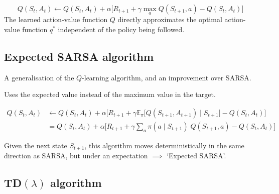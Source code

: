 \begin{equation}
    Q(S_t, A_t) \leftarrow Q(S_t, A_t) + \alpha \Big[ R_{t+1} + \gamma \max_{a} Q(S_{t+1}, a) - Q(S_t, A_t) \Big]
\end{equation}
The learned action-value function \( Q \) directly approximates the optimal action-value function \( q^* \) independent of the policy being followed.

\subsection{Expected SARSA algorithm}

A generalisation of the \( Q \)-learning algorithm, and an improvement over SARSA.\@

Uses the expected value instead of the maximum value in the target.

\begin{equation}
    \begin{aligned}
        Q(S_t, A_t)
         & \leftarrow
        Q(S_t, A_t) + \alpha \Big[ R_{t+1} + \gamma \mathbb{E}_{\pi} \big[ Q(S_{t+1}, A_{t+1}) \;\big|\; S_{t+1} \big] - Q(S_t, A_t) \Big]
        \\ & =
        Q(S_t, A_t) + \alpha \Big[ R_{t+1} + \gamma \sum_{a} \pi(a \mid S_{t+1}) \; Q(S_{t+1}, a) - Q(S_t, A_t) \Big]
    \end{aligned}
\end{equation}

Given the next state \( S_{t+1} \), this algorithm moves deterministically in the same direction as SARSA, but under an expectation \( \implies \) `Expected SARSA'.

\subsection{TD\texorpdfstring{\( (\lambda) \)}{ (lambda) } algorithm}
